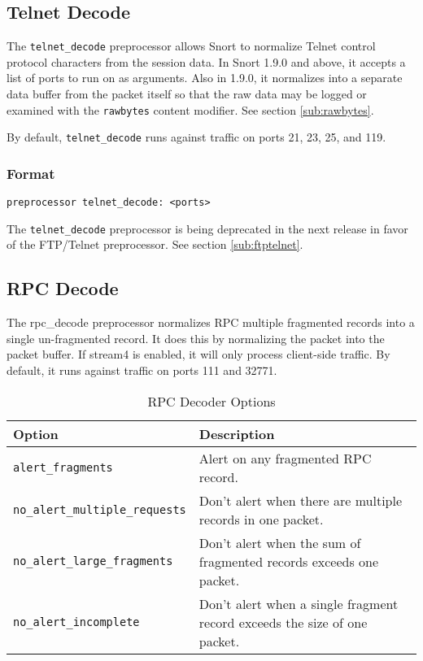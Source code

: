 \documentclass[english]{report}
\newenvironment{note}{
\samepage
    \vspace{10pt}{\textsf{
        {\hspace{7pt}\Huge{$\triangle$\hspace{-12.5pt}{\Large{$^!$}}}}\hspace{5pt}
        {\Large{NOTE}}
    }
    }
   \begin{center}
    \par\vspace{-17pt}

    \begin{lrbox}{\savepar}
    \begin{minipage}[r]{6in}
}
{
    \end{minipage}
    \end{lrbox}
    \fbox{
        \usebox{
            \savepar
	}
    }
    \par\vskip10pt
    \end{center}
}
\newenvironment{note}{
        \begin{rawhtml}
        <p><table border="1"><tr><td><b>
        Note:&nbsp;&nbsp;</b>
        \end{rawhtml}
}{
        \begin{rawhtml}
        </b></td></tr></table></p>
        \end{rawhtml}
}
\begin{document}
\subsection{Telnet Decode\label{sub:telnet-decode}}

The \texttt{telnet\_decode} preprocessor allows Snort to normalize Telnet control
protocol characters from the session data. In Snort 1.9.0 and above,
it accepts a list of ports to run on as arguments. Also in 1.9.0,
it normalizes into a separate data buffer from the packet itself so
that the raw data may be logged or examined with the \texttt{rawbytes} content
modifier.  See section \ref{sub:rawbytes}.

By default, \texttt{telnet\_decode} runs against traffic on ports 21, 23, 25, and 119.

\subsubsection{Format}

\begin{verbatim}
preprocessor telnet_decode: <ports> 
\end{verbatim}

\begin{note}
The \texttt{telnet\_decode} preprocessor is being deprecated in the next
release in favor of the FTP/Telnet preprocessor.  See section \ref{sub:ftptelnet}.
\end{note}

\subsection{RPC Decode\label{sub:rpc-decoder}}

The rpc\_decode preprocessor normalizes RPC multiple fragmented
records into a single un-fragmented record.  It does this by
normalizing the packet into the packet buffer.  If stream4 is
enabled, it will only process client-side traffic.  By default, it runs against
traffic on ports 111 and 32771.

\begin{table}[!hbpt]

\caption{RPC Decoder Options\label{rpc options}}

\begin{center}\begin{tabular}{| l | l |}
\hline 
\textbf{Option}&
\textbf{Description}\\
\hline
\hline 
\texttt{alert\_fragments}&
Alert on any fragmented RPC record.\\
\hline 
\texttt{no\_alert\_multiple\_requests}&
Don't alert when there are multiple records in one packet.\\
\hline 
\texttt{no\_alert\_large\_fragments}&
Don't alert when the sum of fragmented records exceeds one packet.\\
\hline 
\texttt{no\_alert\_incomplete}&
Don't alert when a single fragment record exceeds the size of one
packet.\\
\hline
\end{tabular}\end{center}
\end{table}
\end{document}
